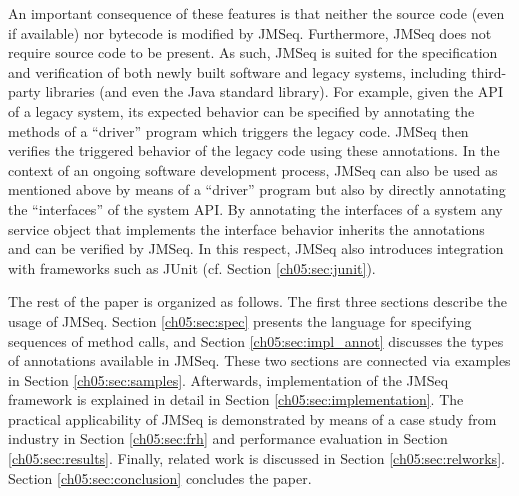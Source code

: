 An important consequence of these features
is that neither  the source code (even if available) nor bytecode is modified by JMSeq. 
Furthermore,  JMSeq does not require source code to be present.  
As such, JMSeq is suited for
the specification and verification of both
 newly built software and legacy systems, including third-party libraries
(and even the Java standard library).
For example, given  the API of a legacy system, its expected behavior  can be
specified by annotating the methods of a ``driver'' program which triggers
the legacy code.
JMSeq then verifies the triggered behavior of the legacy code using these
annotations.
%
 In the context of an ongoing software development process, JMSeq can also be used as mentioned above
by means of a ``driver'' program but also by directly
annotating the ``interfaces'' of the system API.
By annotating the  interfaces of a system any service object that implements the interface behavior inherits the annotations and can be verified by JMSeq.
In this  respect, JMSeq also introduces integration with frameworks such as JUnit (cf. Section \ref{ch05:sec:junit}). 



The rest of the paper is organized as follows.
The first three sections describe the usage of JMSeq.
Section \ref{ch05:sec:spec} presents the language for specifying sequences of method calls, 
and Section \ref{ch05:sec:impl_annot} discusses the types of annotations available in JMSeq.
These two sections are connected via examples in Section \ref{ch05:sec:samples}.
Afterwards, implementation of the JMSeq framework is explained in detail in Section \ref{ch05:sec:implementation}.
The practical applicability of JMSeq is demonstrated by means of a case study from industry in Section \ref{ch05:sec:frh} and performance evaluation in Section \ref{ch05:sec:results}. 
Finally, related work is discussed in Section \ref{ch05:sec:relworks}.
Section \ref{ch05:sec:conclusion} concludes the paper. %

